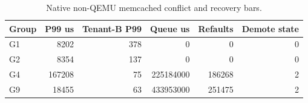 
\begin{table}[t]
\centering
\scriptsize
\caption{Native non-QEMU memcached conflict and recovery bars.}
\begin{tabular}{lrrrrr}
\toprule
Group & P99 us & Tenant-B P99 & Queue us & Refaults & Demote state \\
\midrule
G1 & 8202 & 378 & 0 & 0 & 0 \\
G2 & 8354 & 137 & 0 & 0 & 0 \\
G4 & 167208 & 75 & 225184000 & 186268 & 2 \\
G9 & 18455 & 63 & 433953000 & 251475 & 2 \\
\bottomrule
\end{tabular}
\end{table}
